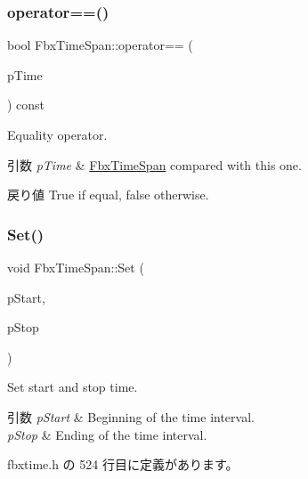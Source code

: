 \subsubsection{\texorpdfstring{operator==()}{operator==()}}
{\footnotesize\ttfamily bool Fbx\+Time\+Span\+::operator== (\begin{DoxyParamCaption}\item[{const \hyperlink{class_fbx_time_span}{Fbx\+Time\+Span} \&}]{p\+Time }\end{DoxyParamCaption}) const}

Equality operator. 
\begin{DoxyParams}{引数}
{\em p\+Time} & \hyperlink{class_fbx_time_span}{Fbx\+Time\+Span} compared with this one. \\
\hline
\end{DoxyParams}
\begin{DoxyReturn}{戻り値}
{\ttfamily True} if equal, {\ttfamily false} otherwise. 
\end{DoxyReturn}
\mbox{\label{class_fbx_time_span_a29861241ccf52ec9c3f491d336209ff7}} 
\subsubsection{\texorpdfstring{Set()}{Set()}}
{\footnotesize\ttfamily void Fbx\+Time\+Span\+::\+Set (\begin{DoxyParamCaption}\item[{\hyperlink{class_fbx_time}{Fbx\+Time}}]{p\+Start,  }\item[{\hyperlink{class_fbx_time}{Fbx\+Time}}]{p\+Stop }\end{DoxyParamCaption})\hspace{0.3cm}{\ttfamily [inline]}}

Set start and stop time. 
\begin{DoxyParams}{引数}
{\em p\+Start} & Beginning of the time interval. \\
\hline
{\em p\+Stop} & Ending of the time interval. \\
\hline
\end{DoxyParams}


 fbxtime.\+h の 524 行目に定義があります。

\mbox{\label{class_fbx_time_span_a453592f02b54bc27d664386c1d37abda}} 
